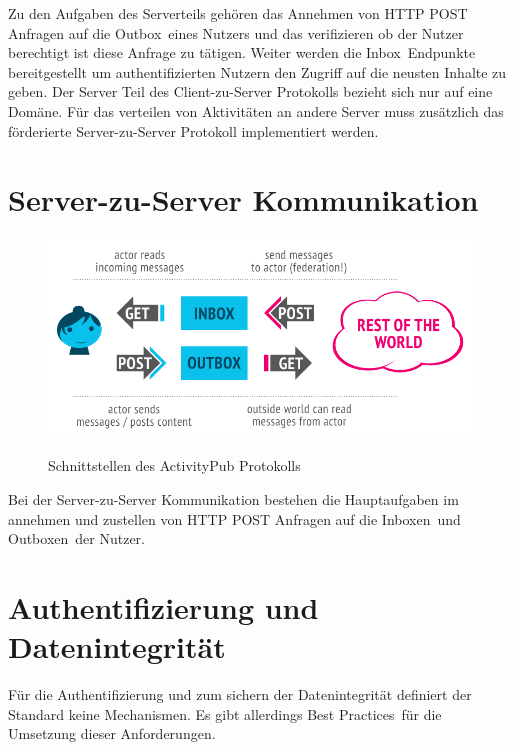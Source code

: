 	Zu den Aufgaben des Serverteils gehören das Annehmen von HTTP POST Anfragen auf die \glqq Outbox\grqq~eines Nutzers und das verifizieren ob der Nutzer berechtigt ist diese Anfrage zu tätigen. Weiter werden die \glqq Inbox\grqq~Endpunkte bereitgestellt um authentifizierten Nutzern den Zugriff auf die neusten Inhalte zu geben. Der Server Teil des Client-zu-Server Protokolls bezieht sich nur auf eine Domäne. Für das verteilen von Aktivitäten an andere Server muss zusätzlich das förderierte Server-zu-Server Protokoll implementiert werden.

\section{Server-zu-Server Kommunikation}
	\begin{figure}[h]
		\begin{minipage}{\textwidth}
			\centering
			\includegraphics[scale=0.55]{figures/client-server-federated.png}
			\label{Client zu Server und Server zu Server Interaktionen}
			\caption{Schnittstellen des ActivityPub Protokolls}
		\end{minipage}
	\end{figure}
	Bei der Server-zu-Server Kommunikation bestehen die Hauptaufgaben im annehmen und zustellen von HTTP POST Anfragen auf die \glqq Inboxen\grqq~und \glqq Outboxen\grqq~der Nutzer.
	
\section{Authentifizierung und Datenintegrität}
	Für die Authentifizierung und zum sichern der Datenintegrität definiert der Standard keine Mechanismen. Es gibt allerdings \glqq Best Practices\grqq~für die Umsetzung dieser Anforderungen.\\
	
